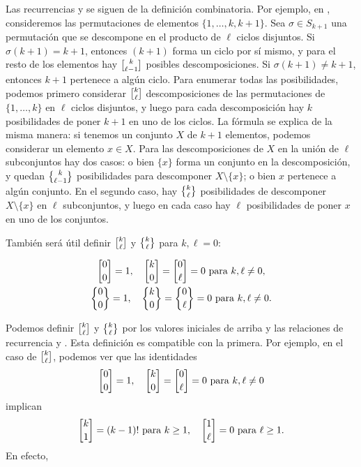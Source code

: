 \documentclass{article}
\begin{document}
Las recurrencias  y  se siguen de la definición combinatoria. Por ejemplo, en , consideremos las permutaciones de elementos $\{ 1, \ldots, k, k+1 \}$. Sea $\sigma \in S_{k+1}$ una permutación que se descompone en el producto de $\ell$ ciclos disjuntos. Si $\sigma (k+1) = k+1$, entonces $(k+1)$ forma un ciclo por sí mismo, y para el resto de los elementos hay $\stirling{k}{\ell-1}$ posibles descomposiciones. Si $\sigma (k+1) \ne k+1$, entonces $k+1$ pertenece a algún ciclo. Para enumerar todas las posibilidades, podemos primero considerar $\stirling{k}{\ell}$ descomposiciones de las permutaciones de $\{ 1,\ldots,k \}$ en $\ell$ ciclos disjuntos, y luego para cada descomposición hay $k$ posibilidades de poner $k+1$ en uno de los ciclos. La fórmula  se explica de la misma manera: si tenemos un conjunto $X$ de $k+1$ elementos, podemos considerar un elemento $x\in X$. Para las descomposiciones de $X$ en la unión de $\ell$ subconjuntos hay dos casos: o bien $\{ x \}$ forma un conjunto en la descomposición, y quedan $\Stirling{k}{\ell-1}$ posibilidades para descomponer $X\setminus \{ x \}$; o bien $x$ pertenece a algún conjunto. En el segundo caso, hay $\Stirling{k}{\ell}$ posibilidades de descomponer $X\setminus \{ x \}$ en $\ell$ subconjuntos, y luego en cada caso hay $\ell$ posibilidades de poner $x$ en uno de los conjuntos.

\pagebreak

También será útil definir $\stirling{k}{\ell}$ y $\Stirling{k}{\ell}$ para $k,\ell = 0$:

\begin{definicion*}
\label{numeros-de-stirling-para-0}
\begin{gather*}
\stirling{0}{0} = 1, \quad \stirling{k}{0} = \stirling{0}{\ell} = 0 \text{ para }k,\ell\ne 0,\\
\Stirling{0}{0} = 1, \quad \Stirling{k}{0} = \Stirling{0}{\ell} = 0 \text{ para }k,\ell\ne 0.
\end{gather*}
\end{definicion*}

Podemos definir $\stirling{k}{\ell}$ y $\Stirling{k}{\ell}$ por los valores iniciales de arriba y las relaciones de recurrencia  y . Esta definición es compatible con la primera. Por ejemplo, en el caso de $\stirling{k}{\ell}$, podemos ver que las identidades
$$\stirling{0}{0} = 1, \quad \stirling{k}{0} = \stirling{0}{\ell} = 0 \text{ para }k,\ell\ne 0$$
implican
$$\stirling{k}{1} = (k-1)! \text{ para }k \ge 1, \quad \stirling{1}{\ell} = 0 \text{ para }\ell \ge 1.$$
En efecto,
\end{document}

